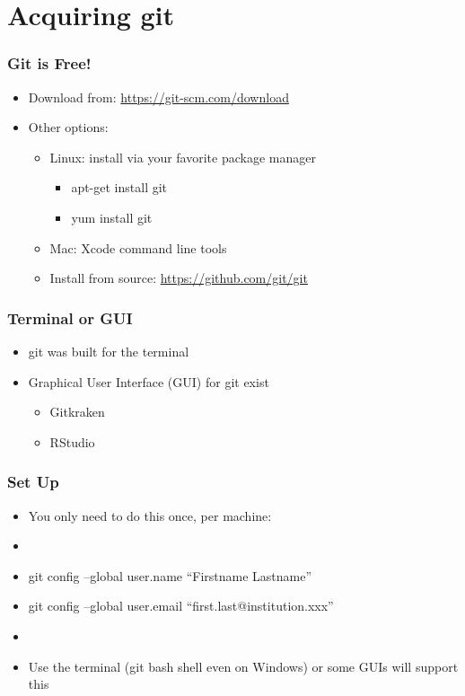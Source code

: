 \section{Acquiring git}
\begin{frame}
  \frametitle{Git is Free!}

  \begin{itemize}
    \item Download from: \url{https://git-scm.com/download}

    \item Other options:

    \begin{itemize}
      \item Linux: install via your favorite package manager
        \begin{itemize}
          \item apt-get install git
          \item yum install git
        \end{itemize}
      \item Mac: Xcode command line tools
      \item Install from source: \url{https://github.com/git/git}
    \end{itemize}
  \end{itemize}
\end{frame}

\begin{frame}
  \frametitle{Terminal or GUI}
  \begin{itemize}
    \item git was built for the terminal
    \item Graphical User Interface (GUI) for git exist
      \begin{itemize}
        \item Gitkraken
        \item RStudio
      \end{itemize}
  \end{itemize}
\end{frame}

\begin{frame}
  \frametitle{Set Up}

  \begin{itemize}
    \item You only need to do this once, per machine:
    \item[]
    \item[] git config --global user.name ``Firstname Lastname''
    \item[] git config --global user.email ``first.last@institution.xxx''
    \item[]
    \item Use the terminal (git bash shell even on Windows) or some GUIs will
      support this
  \end{itemize}

\end{frame}
